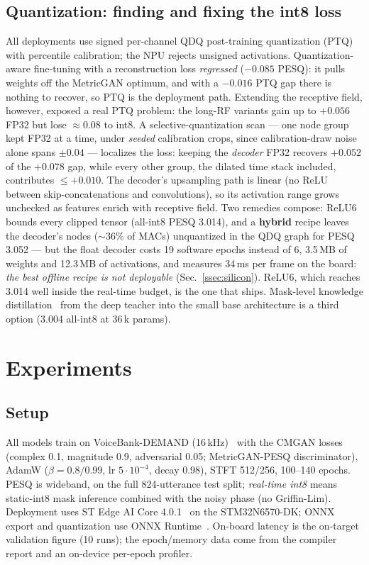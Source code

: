\documentclass{article}
\begin{document}
\subsection{Quantization: finding and fixing the int8 loss}
\label{ssec:quant}

All deployments use signed per-channel QDQ post-training quantization (PTQ)
with percentile calibration; the NPU rejects unsigned activations.
Quantization-aware fine-tuning with a reconstruction loss \emph{regressed}
($-0.085$ PESQ): it pulls weights off the MetricGAN optimum, and with a
$-0.016$ PTQ gap there is nothing to recover, so PTQ is the deployment path.
Extending the receptive field, however, exposed a real PTQ problem: the
long-RF variants gain up to $+0.056$ FP32 but lose $\approx0.08$ to int8. A
selective-quantization scan --- one node group kept FP32 at a time, under
\emph{seeded} calibration crops, since calibration-draw noise alone spans
$\pm0.04$ --- localizes the loss: keeping the \emph{decoder} FP32 recovers
$+0.052$ of the $+0.078$ gap, while every other group, the dilated time stack
included, contributes $\leq+0.010$. The decoder's upsampling path is linear
(no ReLU between skip-concatenations and convolutions), so its activation
range grows unchecked as features enrich with receptive field. Two remedies
compose: ReLU6 bounds every clipped tensor (all-int8 PESQ 3.014), and a
\textbf{hybrid} recipe leaves the decoder's nodes ($\sim$36\% of MACs)
unquantized in the QDQ graph for PESQ 3.052 --- but the float decoder costs
19 software epochs instead of 6, 3.5\,MB of weights and 12.3\,MB of
activations, and measures 34\,ms per frame on the board: \emph{the best
offline recipe is not deployable} (Sec.~\ref{ssec:silicon}). ReLU6, which
reaches 3.014 well inside the real-time budget, is the one that ships.
Mask-level knowledge distillation~\cite{hinton2015kd} from the deep teacher
into the small base architecture is a third option (3.004 all-int8 at
36\,k params).

\section{Experiments}
\label{sec:experiments}

\subsection{Setup}
\label{ssec:setup}

All models train on VoiceBank-DEMAND (16\,kHz)~\cite{valentini2016vbd} with
the CMGAN losses (complex 0.1, magnitude 0.9, adversarial 0.05;
MetricGAN-PESQ discriminator), AdamW ($\beta{=}0.8/0.99$, lr $5{\cdot}10^{-4}$,
decay 0.98), STFT 512/256, 100--140 epochs. PESQ is wideband, on the full
824-utterance test split; \emph{real-time int8} means static-int8 mask
inference combined with the noisy phase (no Griffin-Lim). Deployment uses ST
Edge AI Core 4.0.1~\cite{st2024edgeai} on the STM32N6570-DK; ONNX export and
quantization use ONNX Runtime~\cite{onnxruntime}. On-board latency is the
on-target validation figure (10 runs); the epoch/memory data come from the
compiler report and an on-device per-epoch profiler.
\end{document}
